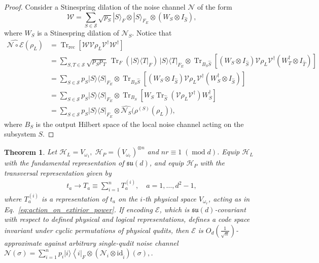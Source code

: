 \documentclass[11pt,letterpaper]{article}
\theoremstyle{plain}
\theoremstyle{plain}
\theoremstyle{plain}
\theoremstyle{plain}
\theoremstyle{plain}
\theoremstyle{plain}
\theoremstyle{plain}
\newtheorem{smtheorem}{Theorem}[section]
\theoremstyle{definition}
\theoremstyle{plain}
\begin{document}
\begin{proof}
    Consider a Stinespring dilation of the noise channel $\mathcal{N}$ of the form
    \[
        \mathcal{W}
        =
        \sum_{S\in\mathcal S}
        \sqrt{p_S}
        |S\rangle_F
        \otimes
        |S\rangle_{F_E}
        \otimes
        \left(W_S \otimes I_{\hat S}\right),
    \]
    where $W_S$ is a Stinespring dilation of $\mathcal{N}_S$. Notice that
\[
    \begin{aligned}
    \widehat{\mathcal{N}\circ\mathcal{E}}(\rho_L)
    &=
    \operatorname{Tr}_{\mathrm{rec}}
    \left[
    \mathcal W \mathcal{V}\rho_L\mathcal{V}^\dagger \mathcal W^\dagger
    \right]
    \\
    &=
    \sum_{S,T\in\mathcal S}
    \sqrt{p_Sp_T}\,
    \operatorname{Tr}_F(|S\rangle\langle T|_F)\,
    |S\rangle\langle T|_{F_E}
    \otimes
    \operatorname{Tr}_{B_S\hat S}
    \left[
    (W_S\otimes I_{\hat S})
    \mathcal{V}\rho_L\mathcal{V}^\dagger
    (W_T^\dagger\otimes I_{\hat T})
    \right]
    \\
    &=
    \sum_{S\in\mathcal S}
    p_S |S\rangle\langle S|_{F_E}
    \otimes
    \operatorname{Tr}_{B_S\hat S}
    \left[
    (W_S\otimes I_{\hat S})
    \mathcal{V}\rho_L\mathcal{V}^\dagger
    (W_S^\dagger\otimes I_{\hat S})
    \right]
    \\
    &=
    \sum_{S\in\mathcal S}
    p_S |S\rangle\langle S|_{F_E}
    \otimes
    \operatorname{Tr}_{B_S}
    \left[
    W_S
    \operatorname{Tr}_{\hat S}(\mathcal{V}\rho_L\mathcal{V}^\dagger)
    W_S^\dagger
    \right]
    \\
    &=
    \sum_{S\in\mathcal S}
    p_S |S\rangle\langle S|_{F_E}
    \otimes
    \widehat{\mathcal N_S}\bigl(\rho^{(S)}(\rho_L)\bigr),
    \end{aligned}
\]
where $B_S$ is the output Hilbert space of the local noise channel acting on the subsystem $S$.
\end{proof}
\begin{smtheorem}\label{thrm:sudscale_general}
            Let
$
    \mathcal H_L=V_{\omega_1},\;
    \mathcal H_P=(V_{\omega_r})^{\otimes n}
$
and $nr\equiv 1\;(\operatorname{mod} d)$.
Equip \(\mathcal H_L\) with the fundamental representation of
\(\mathfrak{su}(d)\), and equip \(\mathcal H_P\) with the transversal
representation given by
\begin{equation}\label{eq:global_generators}
\begin{gathered}
t_a \rightarrow T_a \equiv \sum_{i=1}^n T_a^{(i)}, \quad a=1,\ldots,d^2-1,
\end{gathered}
\end{equation} 
where $T_a^{(i)}$ is a representation of $t_a$ on the $i$-th physical space $V_{\omega_r}$, acting as in Eq.~\eqref{eq:action_on_extirior_power}. 
If encoding $\mathcal{E}$, which is $\mathfrak{su}(d)$-covariant with respect to defined physical and logical representations, 
defines a code space invariant under cyclic permutations of physical qudits, then $\mathcal{E}$ is $O_{d}\left(\frac{1}{\sqrt{n}}\right)$-approximate against arbitrary single-qudit noise 
channel $\mathcal{N}(\sigma)=\sum_{i=1}^n p_i|i\rangle\left\langle\left. i\right|_F \otimes\left(\mathcal{N}_i \otimes \mathrm{id}_{\hat{i}}\right)(\sigma),\right.$.
\end{smtheorem}
\end{document}
